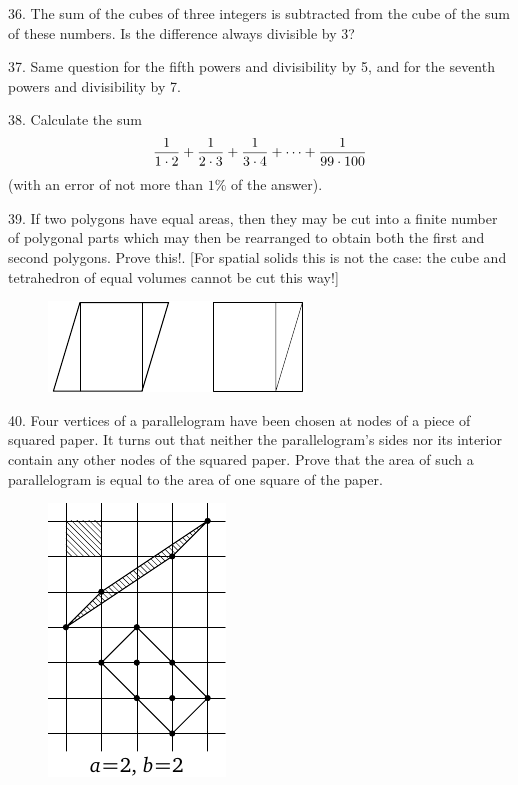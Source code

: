 \begin{problem}{36.}
	The sum of the cubes of three integers is subtracted from the cube of the sum of these numbers. Is the difference always divisible by 3?
\end{problem}

\begin{problem}{37.}
	Same question for the fifth powers and divisibility by 5, and for the seventh powers and divisibility by 7.
\end{problem}

\begin{problem}{38.}
	Calculate the sum
	$${1 \over 1\cdot 2} +  {1 \over 2\cdot 3} + {1 \over 3\cdot 4} + \dots + {1 \over 99\cdot 100}$$
	(with an error of not more than $1\%$ of the answer).
\end{problem}

\begin{problem}{39.}
	If two polygons have equal areas, then they may be cut into a finite number of polygonal parts which may then be rearranged to obtain both the first and second polygons. Prove this!. [For spatial solids this is not the case: the cube and tetrahedron of equal volumes cannot be cut this way!]
	\begin{figure}[h]
	\centering
	\includegraphics{q39_horizontal}\\[6pt]
	\end{figure}
\end{problem}

\begin{problem}{40.}
	Four vertices of a parallelogram have been chosen at nodes of a piece of squared paper. It turns out that neither the parallelogram's sides nor its interior contain any other nodes of the squared paper. Prove that the area of such a parallelogram is equal to the area of one square of the paper. 
	\begin{figure}[h]
	 \centering
	\includegraphics{taskbook-24}\vskip3pt
	\end{figure}
\end{problem}

